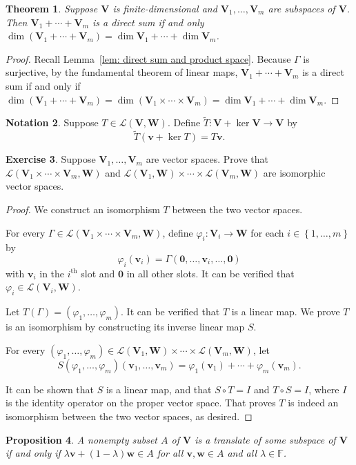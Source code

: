 \documentclass{tufte-handout}
\def \v {\vspace{0.2cm}}
\theoremstyle{plain} %
\newtheorem{thm}{Theorem}
\newtheorem{prop}[thm]{Proposition}
\theoremstyle{definition}
\newtheorem{notn}[thm]{Notation}
\newtheorem{exer}[thm]{Exercise}
\theoremstyle{remark}
\newcommand{\bra}[1]{\mathopen{}\left(#1\right)}
\newcommand{\cbra}[1]{\mathopen{}\left\{#1\right\}}
\renewcommand{\phi}{\varphi}
\newcommand{\F}{\mathbb{F}}
\newcommand{\mL}{\mathcal{L}}
\newcommand{\zero}{\mathbf{0}}
\newcommand{\V}{\bm{V}}
\newcommand{\W}{\bm{W}}
\renewcommand{\v}{\bm{v}}
\newcommand{\w}{\bm{w}}
\begin{document}
\begin{thm}
	Suppose $\V$ is finite-dimensional and $\V_1,\dots,\V_m$ are subspaces of $\V$. Then $\V_1+\cdots+\V_m$ is a direct sum if and only $\dim\bra{\V_1+\cdots+\V_m} = \dim\V_1+\cdots+\dim\V_m$.
\end{thm}
\begin{proof}
	Recall Lemma~\ref{lem: direct sum and product space}. Because $\Gamma$ is surjective, by the fundamental theorem of linear maps, $\V_1+\cdots+\V_m$ is a direct sum if and only if $\dim\bra{\V_1+\cdots+\V_m} = \dim\bra{\V_1\times\cdots\times\V_m} = \dim\V_1+\cdots+\dim\V_m$.
\end{proof}

\begin{notn}
	Suppose $T\in\mL\bra{\V,\W}$. Define $\tilde{T}: \V+\ker\V \to \V$ by
	\[\tilde{T}\bra{\v+\ker T}=T\v.\]
\end{notn}

\begin{exer}
	Suppose $\V_1,\dots,\V_m$ are vector spaces. Prove that $\mL\bra{\V_1\times\cdots\times\V_m,\W}$ and $\mL\bra{\V_1,\W}\times\cdots\times\mL\bra{\V_m,\W}$ are isomorphic vector spaces. 
\end{exer}
\begin{proof}
	We construct an isomorphism $T$ between the two vector spaces.
	
	For every $\Gamma\in\mL\bra{\V_1\times\cdots\times\V_m,\W}$, define $\phi_i:\V_i\to\W$ for each $i\in\cbra{1,\dots,m}$ by
	\[\phi_i\bra{\v_i}=\Gamma\bra{\zero,\dots,\v_i,\dots,\zero}\]
	with $\v_i$ in the $i^\text{th}$ slot and $\zero$ in all other slots. It can be verified that $\phi_i\in\mL\bra{\V_i,\W}$.

	Let $T\bra{\Gamma}=\bra{\phi_1,\dots,\phi_m}$. It can be verified that $T$ is a linear map. We prove $T$ is an isomorphism by constructing its inverse linear map $S$.

	For every $\bra{\phi_1,\dots,\phi_m}\in\mL\bra{\V_1,\W}\times\cdots\times\mL\bra{\V_m,\W}$, let
	\[S\bra{\phi_1,\dots,\phi_m}\bra{\v_1,\dots,\v_m}=\phi_1\bra{\v_1}+\cdots+\phi_m\bra{\v_m}.\]
	
	It can be shown that $S$ is a linear map, and that $S\circ T=I$ and $T\circ S=I$, where $I$ is the identity operator on the proper vector space. That proves $T$ is indeed an isomorphism between the two vector spaces, as desired.
\end{proof}

\begin{prop}\label{prop: test for translate}
	A nonempty subset $A$ of $\V$ is a translate of some subspace of $\V$ if and only if $\lambda\v+\bra{1-\lambda}\w\in A$ for all $\v,\w\in A$ and all $\lambda\in\F$.
\end{prop}
\end{document}
